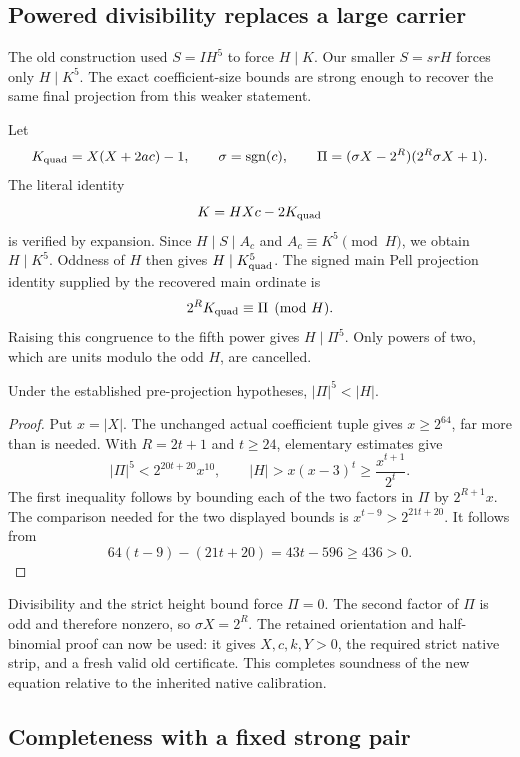 \subsection{Powered divisibility replaces a large carrier}

The old construction used $S=IH^5$ to force $H\mid K$. Our smaller
$S=srH$ forces only $H\mid K^5$. The exact coefficient-size bounds
are strong enough to recover the same final projection from this weaker
statement.

Let
\[
 K_{\rm quad}=X(X+2ac)-1,\qquad \sigma=\operatorname{sgn}(c),\qquad
 \Pi=(\sigma X-2^R)(2^R\sigma X+1).
\]
The literal identity
\begin{equation}
 K=HXc-2K_{\rm quad}
 \label{eq:short-projector}
\end{equation}
is verified by expansion. Since $H\mid S\mid A_c$ and
$A_c\equiv K^5\pmod H$, we obtain $H\mid K^5$. Oddness of $H$
then gives $H\mid K_{\rm quad}^5$. The signed main Pell projection
identity supplied by the recovered main ordinate is
\[
 2^R K_{\rm quad}\equiv\Pi\pmod H.
\]
Raising this congruence to the fifth power gives $H\mid\Pi^5$.
Only powers of two, which are units modulo the odd $H$, are cancelled.

\begin{lemma}
Under the established pre-projection hypotheses, $|\Pi|^5<|H|$.
\end{lemma}
\begin{proof}
Put $x=|X|$. The unchanged actual coefficient tuple gives $x\ge2^{64}$,
far more than is needed. With $R=2t+1$ and $t\ge24$, elementary
estimates give
\[
 |\Pi|^5<2^{20t+20}x^{10},\qquad
 |H|>x(x-3)^t\ge\frac{x^{t+1}}{2^t}.
\]
The first inequality follows by bounding each of the two factors in
$\Pi$ by $2^{R+1}x$. The comparison needed for the two displayed
bounds is $x^{t-9}>2^{21t+20}$. It follows from
\[
 64(t-9)-(21t+20)=43t-596\ge436>0.
\]
\end{proof}

Divisibility and the strict height bound force $\Pi=0$. The second
factor of $\Pi$ is odd and therefore nonzero, so
$\sigma X=2^R$. The retained orientation and half-binomial proof can
now be used: it gives $X,c,k,Y>0$, the required strict native strip,
and a fresh valid old certificate. This completes soundness of the new
equation relative to the inherited native calibration.

\subsection{Completeness with a fixed strong pair}\label{sec:interpolation}

